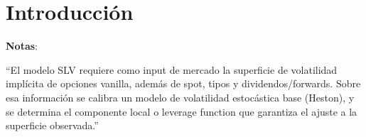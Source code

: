 
\chapter{Introducción}
\textbf{Notas}:\medskip


“El modelo SLV requiere como input de mercado la superficie de volatilidad implícita de opciones vanilla,
además de spot, tipos y dividendos/forwards. Sobre esa información se calibra un modelo de volatilidad
estocástica base (Heston), y se determina el componente local o leverage function que garantiza el
ajuste a la superficie observada.”

